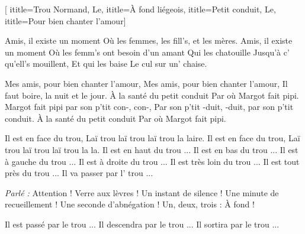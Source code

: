 [
  ititle={Trou Normand, Le},
  ititle={À fond liégeois},
  ititle={Petit conduit, Le},
  ititle={Pour bien chanter l'amour}]


\beginverse
Amis, il existe un moment
Où les femmes, les fill's, et les mères.
Amis, il existe un moment
Où les femm's ont besoin d'un amant
Qui les chatouille
Jusqu'à c' qu'ell's mouillent,
Et qui les baise
Le cul sur un' chaise.
\endverse

\beginverse
Mes amis, pour bien chanter l'amour,
Mes amis, pour bien chanter l'amour,
Il faut boire, la nuit et le jour.
À la santé du petit conduit
Par où Margot fait pipi.
Margot fait pipi par son p'tit con-, con-,
Par son p'tit -duit, -duit, par son p'tit conduit.
À la santé du petit conduit
Par où Margot fait pipi.
\endverse

\beginverse
Il est en face du trou,
Laï trou laï trou laï trou la laire.
Il est en face du trou,
Laï trou laï trou laï trou la la.
Il est en haut du trou ...
Il est en bas du trou ...
Il est à gauche du trou ...
Il est à droite du trou ...
Il est très loin du trou ...
Il est tout près du trou ...
Il va passer par l' trou ...
\endverse

\beginverse
\textit{Parlé :} Attention ! Verre aux lèvres ! Un instant de silence !
Une minute de recueillement ! Une seconde d'abnégation !
Un, deux, trois : À fond !
\endverse

\beginverse
Il est passé par le trou ...
Il descendra par le trou ...
Il sortira par le trou ...
\endverse

\endsong

